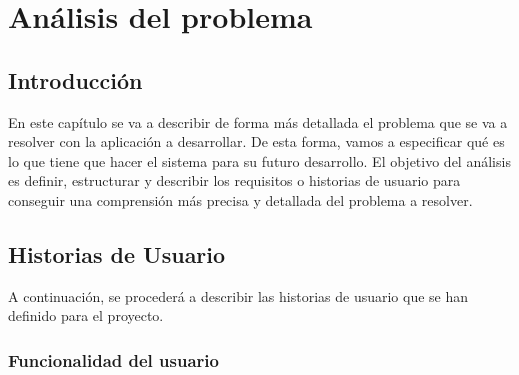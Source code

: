 \chapter{Análisis del problema}

\section{Introducción}
En este capítulo se va a describir de forma más detallada el problema que se va a resolver con la aplicación a desarrollar. De esta forma, vamos a especificar qué es lo que 
tiene que hacer el sistema para su futuro desarrollo. El objetivo del análisis es definir, estructurar y describir los requisitos o historias de usuario para conseguir una comprensión
más precisa y detallada del problema a resolver.
\section{Historias de Usuario}
A continuación, se procederá a describir las historias de usuario que se han definido para el proyecto. 

\subsection*{Funcionalidad del usuario}

